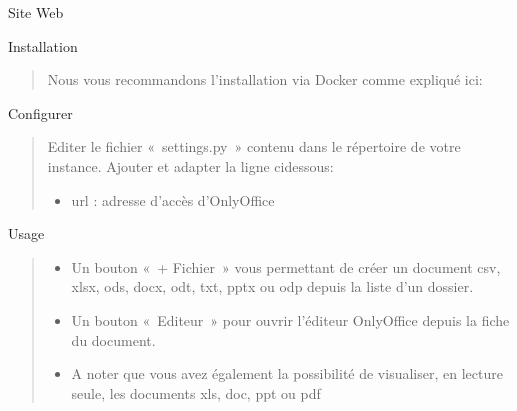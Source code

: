 \documentclass[a4paper,10pt,oneside,french]{sphinxmanual}
\begin{document}
\sphinxAtStartPar
Site Web
\begin{quote}

\sphinxAtStartPar
{}
\end{quote}

\sphinxAtStartPar
Installation
\begin{quote}

\sphinxAtStartPar
Nous vous recommandons l’installation via Docker comme expliqué ici:
\end{quote}

\sphinxAtStartPar
Configurer
\begin{quote}

\sphinxAtStartPar
Editer le fichier « settings.py » contenu dans le répertoire de votre instance.
Ajouter et adapter la ligne ci\sphinxhyphen{}dessous:
\begin{itemize}
\item {} 
\sphinxAtStartPar
url : adresse d’accès d’OnlyOffice

\end{itemize}
\end{quote}

\begin{sphinxVerbatim}[commandchars=\\\{\}]
   
\end{sphinxVerbatim}

\sphinxAtStartPar
Usage
\begin{quote}
\begin{description}
\begin{itemize}
\item {} 
\sphinxAtStartPar
Un bouton « + Fichier » vous permettant de créer un document csv, xlsx, ods, docx, odt, txt, pptx ou odp depuis la liste d’un dossier.

\item {} 
\sphinxAtStartPar
Un bouton « Editeur » pour ouvrir l’éditeur OnlyOffice depuis la fiche du document.

\item {} 
\sphinxAtStartPar
A noter que vous avez également la possibilité de visualiser, en lecture seule, les documents xls, doc, ppt ou pdf

\end{itemize}

\end{description}
\end{quote}
\end{document}
